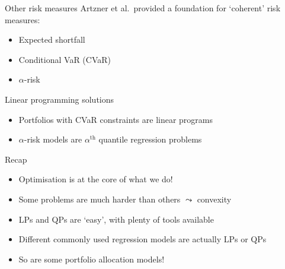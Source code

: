 \documentclass[16pt,aspectratio=169]{beamer}
\begin{document}
\begin{frame}{Other risk measures}
    Artzner et al.\ provided a foundation for `coherent' risk measures:
    \begin{itemize}
        \item Expected shortfall
        \item Conditional VaR (CVaR)
        \item $\alpha$\hyp{}risk
    \end{itemize}
    \vfill
    \pause
    \begin{block}{Linear programming solutions}
        \begin{itemize}
            \item Portfolios with CVaR constraints are linear programs
            \item $\alpha$\hyp{}risk models are $\alpha^{\text{th}}$ quantile
                  regression problems
        \end{itemize}
    \end{block}
\end{frame}

\begin{frame}{Recap}
    \begin{itemize}
        \item Optimisation is at the core of what we do!
        \item Some problems are much harder than others $\leadsto$ convexity
        \item LPs and QPs are `easy', with plenty of tools available
        \item Different commonly used regression models are actually LPs or QPs
        \item So are some portfolio allocation models!
    \end{itemize}
\end{frame}
\end{document}
